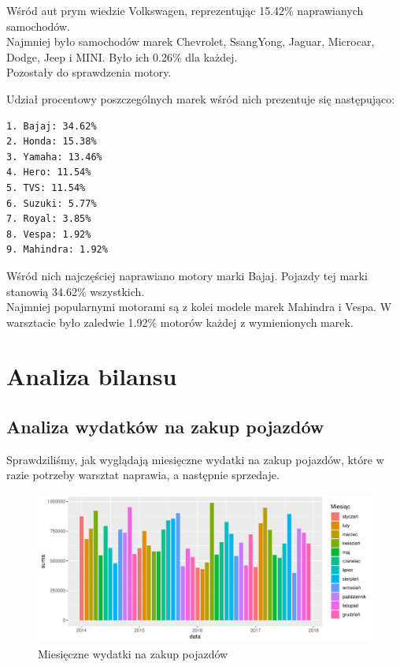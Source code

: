 \documentclass{article}\usepackage[]{graphicx}\usepackage[]{xcolor}
\makeatletter
\def\maxwidth{ %
  \ifdim\Gin@nat@width>\linewidth
    \linewidth
  \else
    \Gin@nat@width
  \fi
}
\newenvironment{knitrout}{}{} %
\makeatother
\begin{document}
Wśród aut prym wiedzie Volkswagen, reprezentując  15.42\% naprawianych samochodów. \\

Najmniej było samochodów marek Chevrolet, SsangYong, Jaguar, Microcar, Dodge, Jeep i MINI. Było ich 0.26\% dla każdej. \\

Pozostały do sprawdzenia motory.



Udział procentowy poszczególnych marek wśród nich prezentuje się następująco:

\begin{verbatim}
1. Bajaj: 34.62%
2. Honda: 15.38%
3. Yamaha: 13.46%
4. Hero: 11.54%
5. TVS: 11.54%
6. Suzuki: 5.77%
7. Royal: 3.85%
8. Vespa: 1.92%
9. Mahindra: 1.92%
\end{verbatim}

Wśród nich najczęściej naprawiano motory marki Bajaj. Pojazdy tej marki stanowią 34.62\% wszystkich. \\

Najmniej popularnymi motorami są z kolei modele marek Mahindra i Vespa. W warsztacie było zaledwie 1.92\% motorów każdej z wymienionych marek.

\section{Analiza bilansu}

\subsection{Analiza wydatków na zakup pojazdów}

Sprawdziliśmy, jak wyglądają miesięczne wydatki na zakup pojazdów, które w razie potrzeby warsztat naprawia, a następnie sprzedaje.

\begin{knitrout}
\color{fgcolor}\begin{figure}[H]

{\centering \includegraphics[width=\maxwidth]{figure/fig_zakup_pojazdu-1} 

}

\caption[Miesięczne wydatki na zakup pojazdów]{Miesięczne wydatki na zakup pojazdów}\label{fig:fig_zakup_pojazdu}
\end{figure}

\end{knitrout}
\end{document}
